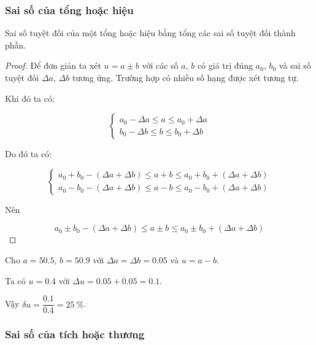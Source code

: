 \documentclass[../../Lectures.tex]{subfiles}
\begin{document}
\subsubsection{Sai số của tổng hoặc hiệu}

\begin{proposition}\label{prop:error_of_sum}
    Sai số tuyệt đối của một tổng hoặc hiệu bằng tổng các sai số tuyệt đối thành
    phần.
\end{proposition}

\begin{proof}
    Để đơn giản ta xét \(u = a \pm b\) với các số \(a\), \(b\) có giá trị đúng
    \(a_0\), \(b_0\) và sai số tuyệt đối \(\Delta a\), \(\Delta b\) tương ứng.
    Trường hợp có nhiều số hạng được xét tương tự.

    Khi đó ta có:

    \[\begin{cases}
        a_0 - \Delta a \leq a \leq a_0 + \Delta a \\
        b_0 - \Delta b \leq b \leq b_0 + \Delta b
    \end{cases}\]

    Do đó ta có:

    \[\begin{cases}
        a_0 + b_0 - (\Delta a + \Delta b) \leq a + b \leq a_0 + b_0 + (\Delta a + \Delta b) \\
        a_0 - b_0 - (\Delta a + \Delta b) \leq a - b \leq a_0 - b_0 + (\Delta a + \Delta b)
    \end{cases}\]

    Nên

    \[a_0 \pm b_0 - (\Delta a + \Delta b) \leq a \pm b \leq a_0 \pm b_0 + (\Delta a + \Delta b)\]
\end{proof}

\begin{exmp}
    Cho \(a = \num{50.5}\), \(b = \num{50.9}\) với \(\Delta a = \Delta b =
    \num{0.05}\) và \(u = a - b\).

    Ta có \(u = \num{0.4}\) với \(\Delta u = \num{0.05} + \num{0.05} =
    \num{0.1}\).

    Vậy \(\delta u = \dfrac{\num{0.1}}{\num{0.4}} = \SI{25}{\percent}\).
\end{exmp}

\subsubsection{Sai số của tích hoặc thương}
\end{document}
